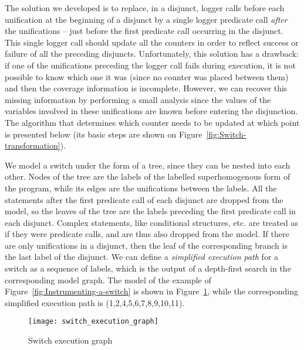 \documentclass[british]{llncs}
\begin{document}
The solution we developed is to replace, in a disjunct,
logger calls
before each unification at the beginning of a disjunct by a single logger predicate call \textit{after} the unifications -- just before the first predicate call occurring in the disjunct. This single logger call should update all the counters in order to
reflect success or failure of 
all the preceding disjuncts.
Unfortunately, this solution has a drawback: if one of the unifications preceding the logger call fails during execution, it is not possible to know which one it was (since no counter was placed between them) and then the coverage information is incomplete. However, we can recover this missing information by performing a small analysis since the values of the variables involved in these unifications are known before entering the disjunction.
The algorithm that determines which counter
needs to be updated at which point is presented below (its basic steps
are shown on Figure~\ref{fig:Switch-transformation}).

We model a switch under the form of a tree, since they can be nested into each
other. Nodes of the tree are the labels of the labelled superhomogenous
form of the program, while its edges are the unifications between the labels. All the
statements after the first predicate call of each disjunct are dropped from the model,
so the leaves of the tree are the labels preceding the first
predicate call in each disjunct. Complex statements,
like conditional structures, etc. are treated as if they were predicate
calls, and are thus also dropped from the model. If there are
only unifications in a disjunct, then the leaf of the corresponding branch is the
last label of the disjunct. We can define a \textit{simplified execution
path} for a switch as a sequence of labels, which is the output of
a depth-first search in the corresponding model graph. The model of
the example of Figure~\ref{fig:Instrumenting-a-switch} is shown in Figure~\ref{fig:Switch-execution-graph},
while the corresponding simplified execution path is (1,2,4,5,6,7,8,9,10,11).

\begin{figure}
\begin{centering}
\texttt{[image: switch\_execution\_graph]} 
\par\end{centering}

\caption{\label{fig:Switch-execution-graph}Switch execution graph}

\end{figure}
\end{document}

